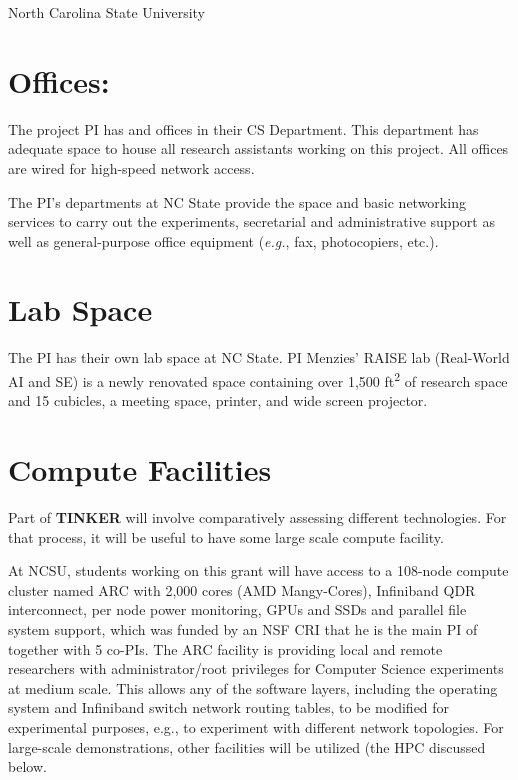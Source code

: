 \documentclass{NSF}
\newcommand{\IT}{{\bf {\sffamily TINKER}}}
\newcommand{\IT}{{\bf {\sffamily TINKER}}}
\begin{document}
\begin{nsfreferences}
      
\end{nsfreferences}
\newpage
\begin{Facilities}{North Carolina State University}

\section*{Offices:}
The project PI has
and offices in their   CS Department.  This
department
has adequate space to house all research assistants
working on this project. All offices are wired for high-speed network
access.

The PI's departments at  NC State provide the space and basic networking services to
carry out the experiments, secretarial and administrative support as
well as general-purpose office equipment ({\em e.g.}, fax, photocopiers,
etc.).

\section*{Lab Space}
The PI has their own lab space at   NC State.
PI  Menzies' RAISE lab (Real-World 
AI and SE) is a newly renovated space 
containing over 1,500 ft\textsuperscript{2} of research space and 
15 cubicles, a meeting space, printer, and wide screen projector. 

\section*{Compute Facilities}
Part of {\IT} will involve comparatively assessing different 
technologies.   For that process, it will be useful to have some large scale compute facility.
 
 At NCSU, students working on this grant will have access to  a 108-node compute cluster named ARC with 
2,000 cores (AMD Mangy-Cores), Infiniband QDR interconnect, per node
power monitoring, GPUs and SSDs and parallel file system support,
which was funded by an NSF CRI that he is the main PI of together with
5 co-PIs.  
The ARC facility is providing local and remote researchers with
administrator/root privileges for Computer Science experiments at
medium scale. This allows any of the software layers, including the
operating system and Infiniband switch network routing tables, to be
modified for experimental purposes, e.g., to experiment with different
network topologies.  For large-scale demonstrations, other 
facilities will be utilized (the HPC discussed below.



\end{Facilities}
\end{document}

